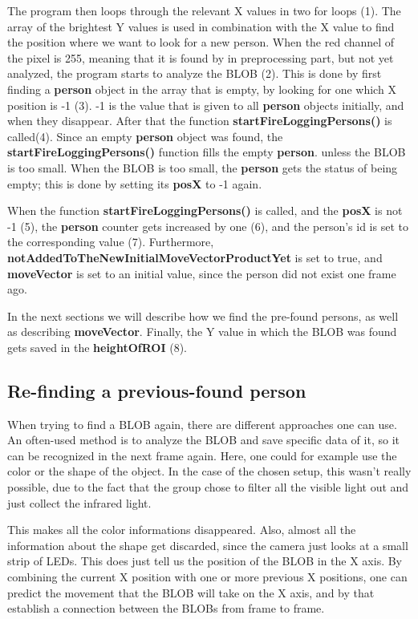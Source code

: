 The program then loops through the relevant X values in two for loops (1). The array of the brightest Y values is used in combination with the X value to find the position where we want to look for a new person. When the red channel of the pixel is 255, meaning that it is found by in preprocessing part, but not yet analyzed, the program starts to analyze the BLOB (2). This is done by first finding a \textbf{person} object in the array that is empty, by looking for one which X position is -1 (3). -1 is the value that is given to all \textbf{person} objects initially, and when they disappear. After that the function \textbf{startFireLoggingPersons()} is called(4). Since an empty \textbf{person} object was found, the \textbf{startFireLoggingPersons()} function fills the empty \textbf{person}. unless the BLOB is too small. When the BLOB is too small, the \textbf{person} gets the status of being empty; this is done by setting its \textbf{posX} to -1 again.

When the function \textbf{startFireLoggingPersons()} is called, and the \textbf{posX} is not -1 (5), the \textbf{person} counter gets increased by one (6), and the person's id is  set to the corresponding value (7). Furthermore, \textbf{notAddedToTheNewInitialMoveVectorProductYet} is set to true, and \textbf{moveVector} is set to an initial value, since the person did not exist one frame ago.

In the next sections we will describe how we find the pre-found persons, as well as describing \textbf{moveVector}. Finally, the Y value in which the BLOB was found gets saved in the \textbf{heightOfROI} (8).

\subsection{Re-finding a previous-found person}
When trying to find a BLOB again, there are different approaches one can use. An often-used method is to analyze the BLOB and save specific data of it, so it can be recognized in the next frame again. Here, one could for example use the color or the shape of the object. In the case of the chosen setup, this wasn't really possible, due to the fact that the group chose to filter all the visible light out and just collect the infrared light.

This makes all the color informations disappeared. Also, almost all the information about the shape get discarded, since the camera just looks at a small strip of LEDs. This does just tell us the position of the BLOB in the X axis. By combining the current X position with one or more previous X positions, one can predict the movement that the BLOB will take on the X axis, and by that establish a connection between the BLOBs from frame to frame. 

